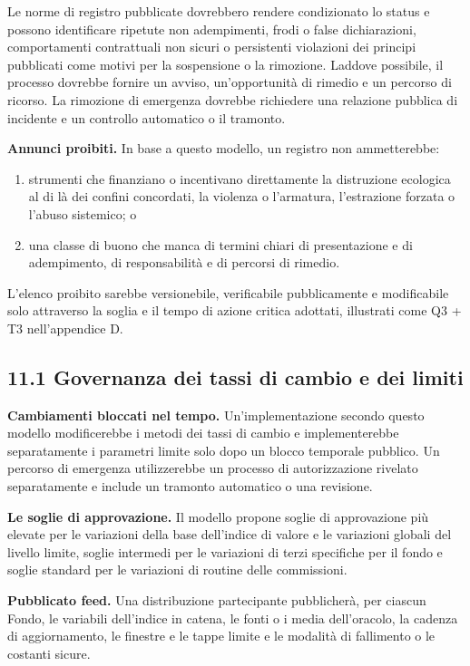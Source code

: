 \documentclass[11pt]{article}
\begin{document}
Le norme di registro pubblicate dovrebbero rendere condizionato lo status e possono identificare ripetute non adempimenti, frodi o false dichiarazioni, comportamenti contrattuali non sicuri o persistenti violazioni dei principi pubblicati come motivi per la sospensione o la rimozione. Laddove possibile, il processo dovrebbe fornire un avviso, un'opportunità di rimedio e un percorso di ricorso. La rimozione di emergenza dovrebbe richiedere una relazione pubblica di incidente e un controllo automatico o il tramonto.

\textbf{Annunci proibiti.} In base a questo modello, un registro non ammetterebbe:

\begin{enumerate}[leftmargin=*]
\item strumenti che finanziano o incentivano direttamente la distruzione ecologica al di là dei confini concordati, la violenza o l'armatura, l'estrazione forzata o l'abuso sistemico; o
\item una classe di buono che manca di termini chiari di presentazione e di adempimento, di responsabilità e di percorsi di rimedio.
\end{enumerate}
L'elenco proibito sarebbe versionebile, verificabile pubblicamente e modificabile solo attraverso la soglia e il tempo di azione critica adottati, illustrati come Q3 + T3 nell'appendice D.

\subsection*{11.1 Governanza dei tassi di cambio e dei limiti}

\textbf{Cambiamenti bloccati nel tempo.} Un'implementazione secondo questo modello modificerebbe i metodi dei tassi di cambio e implementerebbe separatamente i parametri limite solo dopo un blocco temporale pubblico. Un percorso di emergenza utilizzerebbe un processo di autorizzazione rivelato separatamente e include un tramonto automatico o una revisione.

\textbf{Le soglie di approvazione.} Il modello propone soglie di approvazione più elevate per le variazioni della base dell'indice di valore e le variazioni globali del livello limite, soglie intermedi per le variazioni di terzi specifiche per il fondo e soglie standard per le variazioni di routine delle commissioni.

\textbf{Pubblicato feed.} Una distribuzione partecipante pubblicherà, per ciascun Fondo, le variabili dell'indice in catena, le fonti o i media dell'oracolo, la cadenza di aggiornamento, le finestre e le tappe limite e le modalità di fallimento o le costanti sicure.
\end{document}
